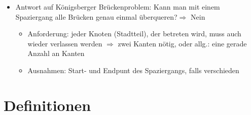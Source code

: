 \begin{itemize}
    \item Antwort auf Königsberger Brückenproblem: \glqq Kann man mit einem Spaziergang alle Brücken genau einmal überqueren?\grqq $\Rightarrow$ Nein
    \begin{itemize}
        \item Anforderung: jeder Knoten (Stadtteil), der betreten wird, muss auch wieder verlassen werden $\Rightarrow$ zwei Kanten nötig, oder allg.: eine gerade Anzahl an Kanten
        \item Ausnahmen: Start- und Endpunt des Spaziergangs, falls verschieden
    \end{itemize}
\end{itemize}

\section{Definitionen}
